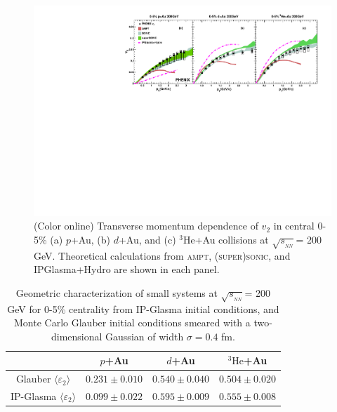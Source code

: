 \documentclass[%
reprint,
showpacs,preprintnumbers,
 amsmath,amssymb,
 aps,
]{revtex4-1}
\newcommand{\pt}{\mbox{$p_T$}\xspace}
\newcommand{\sqsn}{\mbox{$\sqrt{s_{_{NN}}}$}\xspace}
\newcommand{\dau}{\mbox{$d$+Au}\xspace}
\newcommand{\pau}{\mbox{$p$+Au}\xspace}
\newcommand{\hau}{\mbox{$^3\text{He}$+Au}\xspace}
\begin{document}
\begin{figure}[htbp]
  \includegraphics[scale=0.9]{Figures/figure5.pdf}
  \caption{(Color online) Transverse momentum dependence of $v_2$ in central 0-5\% (a) \pau, (b) \dau, and (c) \hau collisions at \sqsn = 200 GeV. Theoretical calculations from \textsc{ampt}, \textsc{(super)sonic}, and IPGlasma+Hydro are shown in each panel.}
\label{fig:figure5}
\end{figure}

\begin{table}
\caption{Geometric characterization of small systems at \sqsn = 200 GeV for 0-5\% centrality from IP-Glasma initial conditions, and Monte Carlo Glauber initial conditions smeared with a two-dimensional Gaussian of width $\sigma=0.4$ fm.}
\begin{ruledtabular}
\begin{tabular}{c c c c}
\label{table_geometry_glasma}
 & \pau & \dau & \hau \\ \hline
 Glauber $\langle \varepsilon_2 \rangle$ & $0.231\pm 0.010$ & $0.540\pm 0.040$ & $0.504\pm 0.020$ \\
 IP-Glasma $\langle \varepsilon_2 \rangle$ & $0.099\pm 0.022$ & $0.595\pm 0.009$ & $0.555\pm 0.008$ \\
\end{tabular}
\end{ruledtabular}
\end{table}
\end{document}
